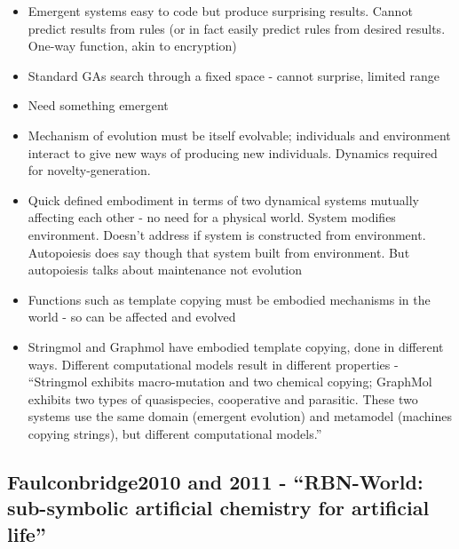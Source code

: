 		\begin{itemize}
			\item
			
			Emergent systems easy to code but produce surprising results. Cannot
			predict results from rules (or in fact easily predict rules from
			desired results. One-way function, akin to encryption)
			
			\item
			
			Standard GAs search through a fixed space - cannot surprise, limited
			range
			
			\item
			
			Need something emergent
			
			\item
			
			Mechanism of evolution must be itself evolvable; individuals and
			environment interact to give new ways of producing new individuals.
			Dynamics required for novelty-generation.
			
			\item
			
			Quick defined embodiment in terms of two dynamical systems mutually
			affecting each other - no need for a physical world. System modifies
			environment. Doesn't address if system is constructed from
			environment. Autopoiesis does say though that system built from
			environment. But autopoiesis talks about maintenance not evolution
			
			\item
			
			Functions such as template copying must be embodied mechanisms in the
			world - so can be affected and evolved
			
			\item
			
			Stringmol and Graphmol have embodied template copying, done in
			different ways. Different computational models result in different
			properties - ``Stringmol exhibits macro-mutation and two chemical
			copying; GraphMol exhibits two types of quasispecies, cooperative and
			parasitic. These two systems use the same domain (emergent evolution)
			and metamodel (machines copying strings), but different computational
			models.''
			
		\end{itemize}
		
		\hypertarget{faulconbridge2010-and-2011---rbn-world-sub-symbolic-artificial-chemistry-for-artificial-life}{\subsection{Faulconbridge2010
				and 2011 - ``RBN-World: sub-symbolic artificial chemistry for artificial
				life''}\label{faulconbridge2010-and-2011---rbn-world-sub-symbolic-artificial-chemistry-for-artificial-life}}
		
